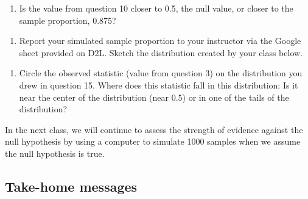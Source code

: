 \documentclass[
]{report}
\providecommand{\tightlist}{%
  \setlength{\itemsep}{0pt}\setlength{\parskip}{0pt}}
\begin{document}
\vspace{0.2in}

\begin{enumerate}
\def\labelenumi{\arabic{enumi}.}
\setcounter{enumi}{10}
\tightlist
\item
  Is the value from question 10 closer to 0.5, the null value, or closer to the sample proportion, 0.875?
\end{enumerate}

\vspace{0.2in}

\begin{enumerate}
\def\labelenumi{\arabic{enumi}.}
\setcounter{enumi}{11}
\tightlist
\item
  Report your simulated sample proportion to your instructor via the Google sheet provided on D2L. Sketch the distribution created by your class below.
\end{enumerate}

\vspace{1.5in}

\begin{enumerate}
\def\labelenumi{\arabic{enumi}.}
\setcounter{enumi}{12}
\tightlist
\item
  Circle the observed statistic (value from question 3) on the distribution you drew in question 15. Where does this statistic fall in this distribution: Is it near the center of the distribution (near 0.5) or in one of the tails of the distribution?
\end{enumerate}

\vspace{1in}

In the next class, we will continue to assess the strength of evidence against the null hypothesis by using a computer to simulate 1000 samples when we assume the null hypothesis is true.

\hypertarget{take-home-messages}{%
\subsection{Take-home messages}\label{take-home-messages}}
\end{document}
